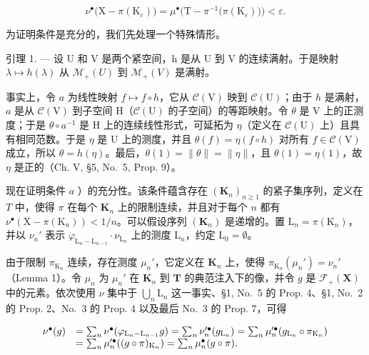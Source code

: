 \[
\nu^ {\bullet} \big (\mathrm{X} - \pi (\mathrm{K} _ {\varepsilon}) \big) = \mu^ {\bullet} \big (\mathrm{T} - \pi^{-1} \big (\pi (\mathrm{K} _ {\varepsilon}) \big) \big) <   \varepsilon .
\]

为证明条件是充分的，我们先处理一个特殊情形。

引理 1. --- 设 U 和 V 是两个紧空间，h 是从 U 到 V 的连续满射。于是映射 \(\lambda \mapsto h(\lambda)\) 从 \(\mathcal{M}_{+}(U)\) 到 \(\mathcal{M}_{+}(V)\) 是满射。

事实上，令 \(a\) 为线性映射 \(f \mapsto f \circ h\)，它从 \(\mathcal{C}(\mathrm{V})\) 映到 \(\mathcal{C}(\mathrm{U})\)；由于 \(h\) 是满射，\(a\) 是从 \(\mathcal{C}(\mathrm{V})\) 到子空间 \(\mathrm{H}\)（\(\mathcal{C}(\mathrm{U})\) 的子空间）的等距映射。令 \(\theta\) 是 \(\mathrm{V}\) 上的正测度；于是 \(\theta \circ a^{-1}\) 是 \(\mathrm{H}\) 上的连续线性形式，可延拓为 \(\eta\)（定义在 \(\mathcal{C}(\mathrm{U})\) 上）且具有相同范数。于是 \(\eta\) 是 \(\mathrm{U}\) 上的测度，并且 \(\theta(f) = \eta(f \circ h)\) 对所有 \(f \in \mathcal{C}(\mathrm{V})\) 成立，所以 \(\theta = h(\eta)\)。最后，\(\theta(1) = \| \theta \| = \| \eta \|\)，且 \(\theta(1) = \eta(1)\)，故 \(\eta\) 是正的（Ch. V, §5, No.~5, Prop. 9）。

现在证明条件 \(a\) ）的充分性。该条件蕴含存在 \((\mathbf{K}_n)_{n \geqslant 1}\) 的紧子集序列，定义在 \(T\) 中，使得 \(\pi\) 在每个 \(\mathbf{K}_n\) 上的限制连续，并且对于每个 \(n\) 都有 \(\nu^{\bullet}(\mathrm{X} - \pi(\mathrm{K}_n)) < 1/n\)。可以假设序列 \((\mathbf{K}_n)\) 是递增的。置 \(\mathrm{L}_n = \pi(\mathrm{K}_n)\)，并以 \(\nu_n'\) 表示 \(\varphi_{\mathrm{L}_n - \mathrm{L}_{n-1}} \cdot \nu_{\mathrm{L}_n}\) 上的测度 \(\mathrm{L}_n\)，约定 \(\mathrm{L}_0 = \emptyset\)。

由于限制 \(\pi_{\mathrm{K}_n}\) 连续，存在测度 \(\mu_n'\)，它定义在 \(\mathbf{K}_n\) 上，使得 \(\pi_{\mathrm{K}_n}(\mu_n') = \nu_n'\)（Lemma 1）。令 \(\mu_n\) 为 \(\mu_n'\) 在 \(\mathbf{K}_n\) 到 \(\mathbf{T}\) 的典范注入下的像，并令 \(g\) 是 \(\mathcal{F}_{+}(\mathbf{X})\) 中的元素。依次使用 \(\nu\) 集中于 \(\bigcup_{n} \mathrm{L}_n\) 这一事实、§1, No.~5 的 Prop. 4、§1, No.~2 的 Prop. 2、No.~3 的 Prop. 4 以及最后 No.~3 的 Prop. 7，可得

\[
\begin{array}{r l} \nu^ {\bullet} (g) & = \sum_ {n} \nu^ {\bullet} (\varphi_ {\mathrm{L} _ {n} - \mathrm{L} _ {n - 1}} g) = \sum_ {n} \nu_ {n} ^ {\prime   \bullet} (g _ {\mathrm{L} _ {n}}) = \sum_ {n} \mu_ {n} ^ {\prime   \bullet} (g _ {\mathrm{L} _ {n}} \circ \pi_ {\mathrm{K} _ {n}}) \\ & = \sum_ {n} \mu_ {n} ^ {\prime   \bullet} ((g \circ \pi) _ {\mathrm{K} _ {n}}) = \sum_ {n} \mu_ {n} ^ {\bullet} (g \circ \pi). \end{array}
\]

